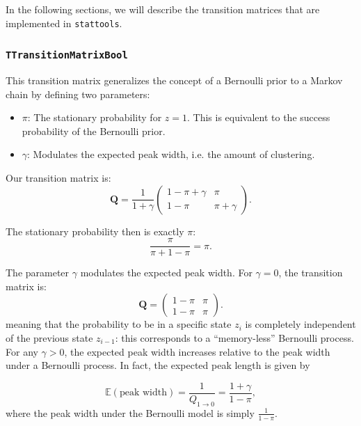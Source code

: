 \documentclass[a4paper,11pt]{article}
\def\Q{\boldsymbol{Q}}
\def\E{\mathbb{E}}
\def\stattools{\texttt{stattools}}
\newcommand{\class}[1]{\texttt{#1}}
\begin{document}
In the following sections, we will describe the transition matrices that are implemented in \stattools{}.

\subsubsection{\class{TTransitionMatrixBool}}\label{section:TTransitionMatrixBool}
This transition matrix generalizes the concept of a Bernoulli prior to a Markov chain by defining two parameters:
\begin{itemize}
 \item $\pi$: The stationary probability for $z=1$. This is equivalent to the success probability of the Bernoulli prior.
 \item $\gamma$: Modulates the expected peak width, i.e. the amount of clustering.
\end{itemize}

Our transition matrix is:
\begin{equation*}
 \Q =  \frac{1}{1+\gamma} \begin{pmatrix}
  1-\pi+\gamma & \pi \\
  1-\pi & \pi + \gamma
\end{pmatrix} .
\end{equation*}

The stationary probability then is exactly $\pi$:
\begin{equation*}
\frac{\pi}{\pi + 1-\pi} = \pi.
\end{equation*}

The parameter $\gamma$ modulates the expected peak width. For $\gamma = 0$, the transition matrix is:
\begin{equation*}
 \Q = \begin{pmatrix}
  1-\pi & \pi \\
  1-\pi & \pi
\end{pmatrix} .
\end{equation*}
meaning that the probability to be in a specific state $z_i$ is completely independent of the previous state $z_{i-1}$: this corresponds to a ``memory-less'' Bernoulli process.
For any $\gamma > 0$, the expected peak width increases relative to the peak width under a Bernoulli process. In fact, the expected peak length is given by

\begin{equation*}
 \E(\mbox{peak width}) = \frac{1}{Q_{1\to0}} = \frac{1+\gamma}{1-\pi},
\end{equation*}
where the peak width under the Bernoulli model is simply $\frac{1}{1-\pi}$.
\end{document}
